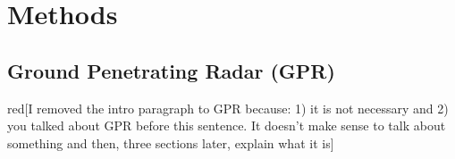\documentclass[5p]{elsarticle}
\newcommand{\alon}{\begin{color}{red}}
\newcommand{\aloff}{\end{color}}
\begin{document}
\section{Methods}




	\subsection{Ground Penetrating Radar (GPR)}
										
        \alon[I removed the intro paragraph to GPR because: 1) it is not necessary and 2) you talked about GPR before this sentence. It doesn't make sense to talk about something and then, three sections later, explain what it is]\aloff
\end{document}
